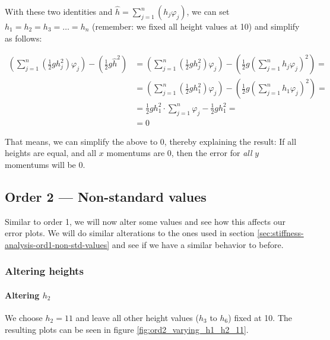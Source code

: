 \documentclass{article}
\renewcommand{\phi}{\varphi}
\begin{document}
With these two identities and $\widehat{h}=\sum_{j=1}^n \left(h_j \phi_j\right)$, we can set $h_1=h_2=h_3=\dots=h_n$ (remember: we fixed all height values at 10) and simplify as follows:

\begin{align*}
  \left( \sum_{j=1}^n \left(\frac{1}{2} g h_j^2\right) \phi_j \right) - \left( \frac{1}{2} g \widehat{h}^2\right) &= \left( \sum_{j=1}^n \left(\frac{1}{2} g h_j^2\right) \phi_j \right) - \left( \frac{1}{2} g \left( \sum_{j=1}^n h_j\phi_j \right)^2\right) = \\
  &= \left( \sum_{j=1}^n \left(\frac{1}{2} g h_1^2\right) \phi_j \right) - \left( \frac{1}{2} g \left( \sum_{j=1}^n h_1\phi_j \right)^2\right) = \\
  &= \frac{1}{2} g h_1^2 \cdot \sum_{j=1}^n \phi_j - \frac{1}{2} g h_1^2 = \\
  &= 0
\end{align*}

That means, we can simplify the above to 0, thereby explaining the result: If all heights are equal, and all $x$ momentums are 0, then the error for \emph{all} $y$ momentums will be 0.

\subsection{Order 2 --- Non-standard values}
\label{sec:stiffness-analysis-ord2-nondefault}

Similar to order 1, we will now alter some values and see how this affects our error plots. We will do similar alterations to the ones used in section \ref{sec:stiffness-analysis-ord1-non-std-values} and see if we have a similar behavior to before.

\subsubsection{Altering heights}
\label{sec:stiffness-analysis-ord2-nondefault-altering-heights}

\paragraph{\texorpdfstring{Altering $h_2$}{Altering h2}}

We choose $h_2=11$ and leave all other height values ($h_3$ to $h_6$) fixed at 10. The resulting plots can be seen in figure \ref{fig:ord2_varying_h1_h2_11}.


\end{document}
